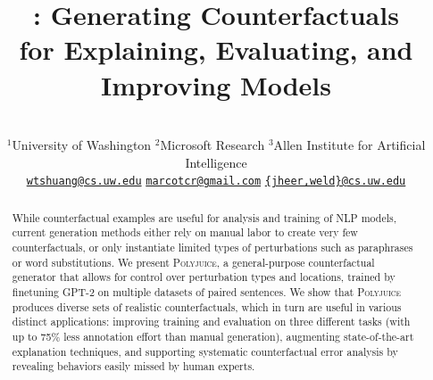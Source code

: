 \documentclass[11pt,a4paper]{article}
\title{\sysname: Generating Counterfactuals \\for Explaining, Evaluating, and Improving Models}
\author{
\makecell{
Tongshuang Wu$^{1}$ ~~~~~~~ 
Marco Tulio Ribeiro$^{2}$ ~~~~~~~ 
Jeffrey Heer$^{1}$ ~~~~~ 
Daniel S. Weld$^{1,3}$}  \\ 
$^{1}$University of Washington\hspace{5mm}
$^{2}$Microsoft Research\hspace{5mm} 
$^{3}$Allen Institute for Artificial Intelligence\hspace{5mm}\\
\hspace{-5mm}
\href{mailto:wtshuang@cs.uw.edu}{\texttt {wtshuang@cs.uw.edu}}
\hspace{5mm}
\href{mailto:marcotcr@microsoft.com}{\texttt {marcotcr@gmail.com}}
\hspace{10mm}
\href{mailto:dan@cs.washington.edu}{\texttt {\{jheer,weld\}@cs.uw.edu}}
}
\date{}
\newcommand{\sysname}{\textsc{Polyjuice}\xspace}
\newcommand{\eg}{\emph{e.g.,}\xspace}%
\newcommand{\ensuretext}[1]{#1}
\newcommand{\marker}[2]{\ensuremath{^{\textsc{#1}}_{\textsc{#2}}}}
\newcommand{\arkcomment}[3]{\ensuretext{\textcolor{#3}{[#1 #2]}}}
\newcommand{\dq}[1]{\arkcomment{\marker{D}{Q}}{#1}{cyan}}
\begin{document}
\maketitle
\begin{abstract}


While counterfactual examples
are useful for analysis and training of NLP models, current generation methods either rely on manual labor to create very few counterfactuals, or 
only instantiate limited types of perturbations such as paraphrases or word substitutions. %
We present \sysname, a general-purpose counterfactual generator that allows for control over perturbation types and locations, trained by finetuning GPT-2 on multiple datasets of paired sentences. 
We show that \sysname produces diverse sets of realistic counterfactuals, which in turn are useful in various distinct applications: improving training and evaluation on three different tasks (with up to 75\% less annotation effort than manual generation), augmenting state-of-the-art explanation techniques, and supporting systematic counterfactual error analysis by revealing behaviors easily missed by human experts.




\end{abstract}
\end{document}
